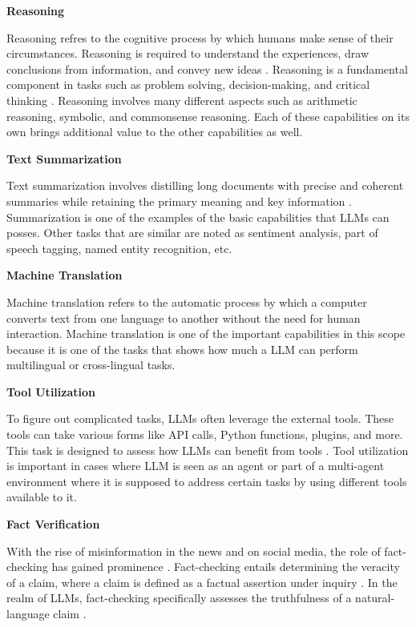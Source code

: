 \textbf{Reasoning}

Reasoning refres to the cognitive process by which humans make sense of their circumstances. Reasoning is required to understand the experiences, draw conclusions from information, and convey new ideas \cite{leighton2004nature}.  Reasoning is a fundamental component in tasks such as problem solving, decision-making, and critical thinking \cite{huang2022towards}. Reasoning involves many different aspects such as arithmetic reasoning, symbolic, and commonsense reasoning. Each of these capabilities on its own brings additional value to the other capabilities as well.

\textbf{Text Summarization}

Text summarization involves distilling long documents with precise and coherent summaries while retaining the primary meaning and key information \cite{basyal2023text}. Summarization is one of the examples of the basic capabilities that LLMs can posses. Other tasks that are similar are noted as sentiment analysis, part of speech tagging, named entity recognition, etc.

\textbf{Machine Translation}

Machine translation refers to the automatic process by which a computer converts text from one language to another without the need for human interaction. Machine translation is one of the important capabilities in this scope because it is one of the tasks that shows how much a LLM can perform multilingual or cross-lingual tasks.


\textbf{Tool Utilization}

To figure out complicated tasks, LLMs often leverage the external tools. These tools can take various forms like API calls, Python functions, plugins, and more. This task is designed to assess how LLMs can benefit from tools \cite{wang2023mint, zhuang2023toolqa}. Tool utilization is important in cases where LLM is seen as an agent or part of a multi-agent environment where it is supposed to address certain tasks by using different tools available to it.

\textbf{Fact Verification}

With the rise of misinformation in the news and on social media, the role of fact-checking has gained prominence \cite{guo2022survey}. Fact-checking entails determining the veracity of a claim, where a claim is defined as a factual assertion under inquiry \cite{pan2021zero}.  In the realm of LLMs, fact-checking specifically assesses the truthfulness of a natural-language claim \cite{kadavath2022language}.


